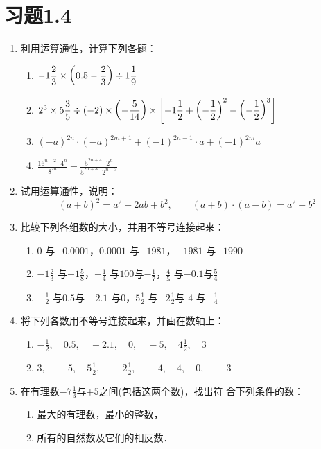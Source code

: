 \section*{习题1.4}
        
\begin{enumerate}
    \item 利用运算通性，计算下列各题：
\begin{enumerate}
    \item $-1\dfrac{2}{3}\times \left(0.5-\dfrac{2}{3}\right)\div 1\dfrac{1}{9}$
    \item $2^3\times 5\dfrac{3}{5}\div (-2)\times\left(-\dfrac{5}{14}\right)\times \left[-1\dfrac{1}{2}+\left(-\dfrac{1}{2}\right)^2-\left(-\dfrac{1}{2}\right)^3\right]$
    \item $(-a)^{2n}\cdot (-a)^{2m+1}+(-1)^{2n-1}\cdot a+(-1)^{2m}a$
    \item $\frac{16^{n-2}\cdot 4^n}{8^{2n}}-\frac{5^{2n+4}\cdot 2^n}{5^{2n+3}\cdot 2^{n-3}}$
\end{enumerate}

\item 试用运算通性，说明：
\[(a+b)^2=a^2+2ab+b^2,\qquad (a+b)\cdot (a-b)=a^2-b^2 \]
\item 比较下列各组数的大小，并用不等号连接起来：
\begin{enumerate}
    \item $0$ 与$-0.0001$，\quad $0.0001$ 与$-1981$，\quad $-1981$ 与$-1990$ 
    \item $-1\frac{2}{3}$ 与$-1\frac{5}{8}$，\quad $-\frac{1}{4}$ 与$100$与$-\frac{1}{7}$，\quad $\frac{4}{5}$ 与$-0.1$与$\frac{5}{4}$
    \item  $-\frac{1}{2}$ 与$0.5$与 $-2.1$ 与$0$，\quad $5\frac{1}{2}$ 与$-2\frac{1}{2}$与 $4$ 与$-\frac{1}{4}$ 
\end{enumerate}

\item 将下列各数用不等号连接起来，并画在数轴上：
\begin{enumerate}
    \item $-\frac{1}{2},\quad  0.5 ,\quad -2.1  ,\quad 0  ,\quad -5  ,\quad  4\frac{1}{2} ,\quad 3  $
    \item $3,\quad  -5 ,\quad 5\frac{1}{2}  ,\quad  -2\frac{1}{2} ,\quad  -4 ,\quad  4 ,\quad  0 ,\quad  -3 $
\end{enumerate}

\item  在有理数$-7\frac{1}{3}$与$+5$之间(包括这两个数)，找出符
合下列条件的数：
\begin{enumerate}
    \item 最大的有理数，最小的整数，
    \item 所有的自然数及它们的相反数．
\end{enumerate}


\end{enumerate}
